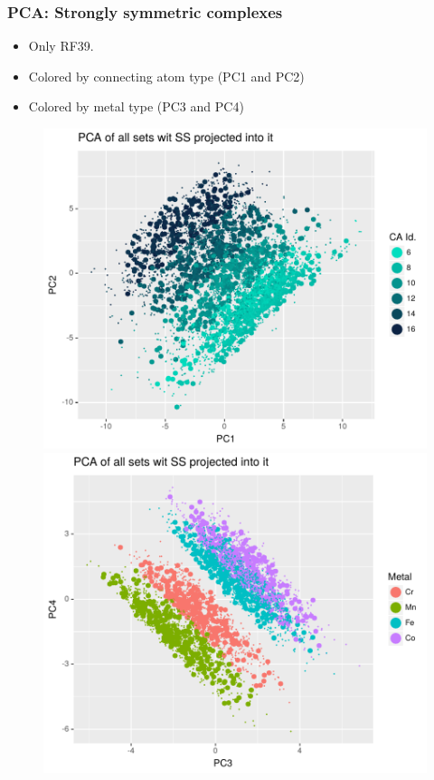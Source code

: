 \documentclass[xcolor=dvipsnames]{beamer}
\begin{document}
\begin{frame}
\frametitle{PCA: Strongly symmetric complexes}
\begin{itemize}
\item Only RF39.
\item Colored by connecting atom type (PC1 and PC2)
\item Colored by metal type (PC3 and PC4)
\end{itemize}

\begin{figure}[ht] 
	\begin{minipage}[b]{0.5\linewidth}
		\centering
		\includegraphics[width=.9\linewidth]{img/pca_rf39_SsIntoSU_cai.pdf} 
	\end{minipage}%
	\begin{minipage}[b]{0.5\linewidth}
		\centering
		\includegraphics[width=.9\linewidth]{img/pca_rf39_SsIntoSU_metal.pdf} 
	\end{minipage} 
\end{figure}
\end{frame}
\end{document}
